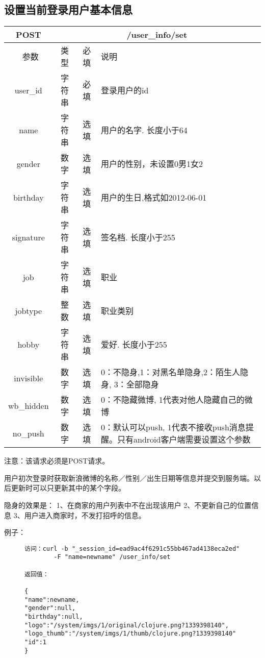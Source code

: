 \subsection{设置当前登录用户基本信息}

\begin{table}[H]
   \begin{center}
\begin{tabular}{|c|c|c|p{12cm}|}
\hline
POST & \multicolumn{3}{|c|}{/user\_info/set} \\
\hline\hline
 \  参数  & 类型 & 必填 &  说明  \\
 \hline
 user\_id  & 字符串 & 必填 &  登录用户的id\\
\hline
 name  & 字符串 & 选填 &  用户的名字. 长度小于64\\
\hline
 gender  & 数字 & 选填 &  用户的性别，未设置0男1女2\\
\hline
 birthday  & 字符串 & 选填 &  用户的生日,格式如2012-06-01\\
 \hline
 signature  & 字符串 & 选填 &  签名档. 长度小于255\\
 \hline
 job  & 字符串 & 选填 &  职业\\
 \hline
 jobtype  & 整数 & 选填 &  职业类别\\
 \hline
 hobby  & 字符串 & 选填 &  爱好. 长度小于255\\
 \hline
 invisible  & 数字 & 选填 &  0：不隐身,1：对黑名单隐身,2：陌生人隐身, 3：全部隐身\\
 \hline
 wb\_hidden  & 数字 & 选填 &  0：不隐藏微博, 1代表对他人隐藏自己的微博\\ 
\hline
 no\_push  & 数字 & 选填 &  0：默认可以push, 1代表不接收push消息提醒。只有android客户端需要设置这个参数\\ 
\hline
\end{tabular}
   \end{center}
\end{table}

注意：该请求必须是POST请求。

用户初次登录时获取新浪微博的名称／性别／出生日期等信息并提交到服务端。以后更新时可以只更新其中的某个字段。

隐身的效果是：
1、在商家的用户列表中不在出现该用户
2、不更新自己的位置信息
3、用户进入商家时，不发打招呼的信息。

例子：

\begin{figure}[H]
\begin{verbatim}
访问：curl -b "_session_id=ead9ac4f6291c55bb467ad4138eca2ed" 
        -F "name=newname" /user_info/set

返回值：

{
"name":newname,
"gender":null,
"birthday":null,
"logo":"/system/imgs/1/original/clojure.png?1339398140",
"logo_thumb":"/system/imgs/1/thumb/clojure.png?1339398140"
"id":1
}

\end{verbatim}
\end{figure}


